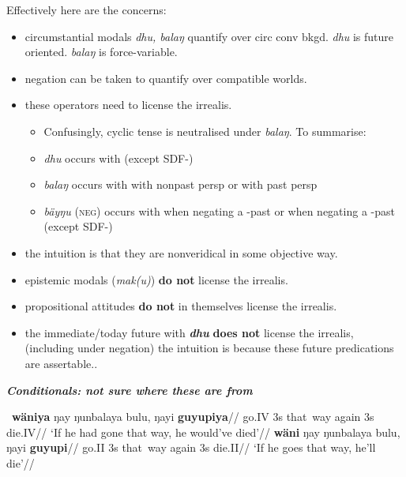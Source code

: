 	\begin{framed}Effectively here are the concerns:
	\begin{itemize}
		\item circumstantial modals \textit{dhu, balaŋ} quantify over circ conv bkgd. \textit{dhu} is future oriented. \textit{balaŋ} is force-variable.
		\item negation can be taken to quantify over compatible worlds. 
		\item these operators need to license the irrealis.
		\begin{itemize}
	\item 	Confusingly, cyclic tense is neutralised under \textit{balaŋ}. To summarise:
	\item \textit{dhu} occurs with \II{} (except SDF-\I)
	\item \textit{balaŋ} occurs with \II{} with nonpast persp or \IV{} with past persp
	\item \textit{bäyŋu} (\textsc{neg}) occurs with \IV{} when negating a \III-past or \II{} when negating a \I-past (except SDF-\I)
		\end{itemize}
		\item the intuition is that they are nonveridical in some objective way.
		\item epistemic modals (\textit{mak(u)}) \textbf{do not} license the irrealis.
		\item propositional attitudes \textbf{do not} in themselves license the irrealis.
		\item the immediate/today future with \textbf{\textit{dhu}} \textbf{does not} license the irrealis, (including under negation) the intuition is because these future predications are assertable..
	
	\end{itemize}%
	\textbf{\textit{Conditionals: not sure where these are from}}
	
	\pex~\a\begingl\gla {}\textbf{wäniya} ŋay ŋunbalaya bulu, ŋayi \textbf{guyupiya}//
	\glb go.IV 3s that~way again 3s die.IV//
	\glft`If he had gone that way, he would've died'//\endgl
	\a \begingl\gla {}\textbf{wäni} ŋay ŋunbalaya bulu, ŋayi \textbf{guyupi}//
	\glb go.II{} 3s that~way again 3s die.II//
	\glft`If he goes that way, he'll die'//\endgl\xe
	\normalsize\end{framed}


